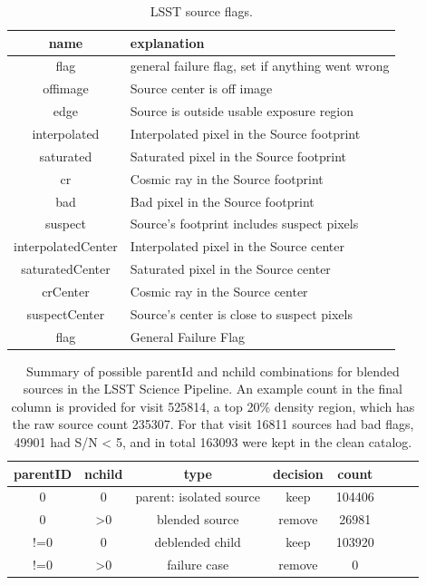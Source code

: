 \documentclass[DM,lsstdraft,toc,usenatbib,authoryear]{lsstdoc}
\begin{document}
\begin{table}
\centering
\caption{LSST source flags.}
\label{tab:lsst_flags}
\begin{tabular}{cl}
\hline
name & explanation \\
\hline
flag & general failure flag, set if anything went wrong \\
offimage & Source center is off image \\
edge & Source is outside usable exposure region  \\
interpolated & Interpolated pixel in the Source footprint \\
saturated & Saturated pixel in the Source footprint \\
cr & Cosmic ray in the Source footprint \\
bad & Bad pixel in the Source footprint \\
suspect & Source's footprint includes suspect pixels \\
interpolatedCenter & Interpolated pixel in the Source center \\
saturatedCenter & Saturated pixel in the Source center \\
crCenter & Cosmic ray in the Source center \\
suspectCenter & Source's center is close to suspect pixels \\
flag & General Failure Flag \\
\hline
\end{tabular}
\end{table}


\begin{table}
\centering
\caption{Summary of possible parentId and nchild combinations for blended sources in the LSST Science Pipeline. An example count in the final column is provided for visit 525814, a top 20\% density region, which has the raw source count 235307. For that visit  16811 sources had bad flags, 49901  had S/N < 5, and in total 163093 were kept in the clean catalog.  }
\label{tab:lsst_deblend}
\begin{tabular}{cccccccc}
\hline
parentID & nchild & type  & decision &  count \\
\hline
0 & 0 & parent: isolated source & keep & 104406 \\
0 & >0 & blended source & remove & 26981 \\
!=0 & 0 & deblended child & keep  &103920\\
!=0 & >0 & failure case & remove & 0 \\
\hline
\end{tabular}
\end{table}
\end{document}
